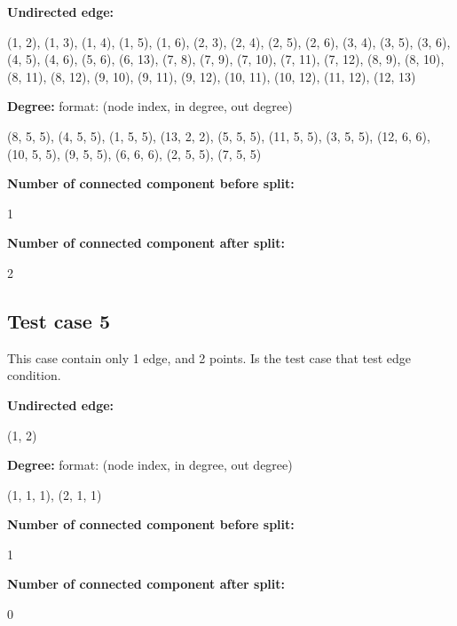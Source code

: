 \par \textbf{Undirected edge:}
\par (1, 2), (1, 3), (1, 4), (1, 5), (1, 6), (2, 3), (2, 4), (2, 5), (2, 6), (3, 4), (3, 5), (3, 6), (4, 5), (4, 6), (5, 6), (6, 13), (7, 8), (7, 9), (7, 10), (7, 11), (7, 12), (8, 9), (8, 10), (8, 11), (8, 12), (9, 10), (9, 11), (9, 12), (10, 11), (10, 12), (11, 12), (12, 13) \\

\par \textbf{Degree:}   format: (node index, in degree, out degree)
\par (8, 5, 5), (4, 5, 5), (1, 5, 5), (13, 2, 2), (5, 5, 5), (11, 5, 5), (3, 5, 5), (12, 6, 6), (10, 5, 5), (9, 5, 5), (6, 6, 6), (2, 5, 5), (7, 5, 5) \\

\par \textbf{Number of connected component before split:}
\par 1\\
\par \textbf{Number of connected component after split:}
\par 2\\

\subsection{Test case 5}
\par This case contain only 1 edge, and 2 points. Is the test case that test edge condition. \\

\par \textbf{Undirected edge:}
\par (1, 2) \\

\par \textbf{Degree:}    format: (node index, in degree, out degree)
\par (1, 1, 1), (2, 1, 1) \\

\par \textbf{Number of connected component before split:}
\par 1\\
\par \textbf{Number of connected component after split:}
\par 0\\

